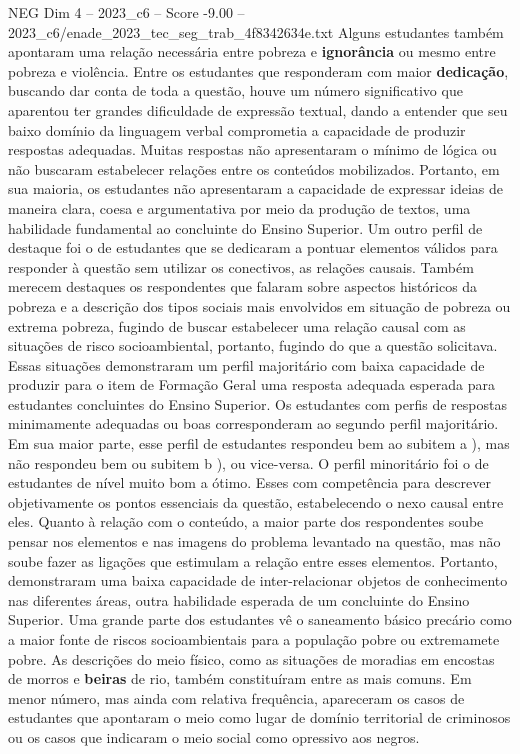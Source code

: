 \begin{textsample}{NEG Dim 4 – 2023\_c6 – Score -9.00 – 2023\_c6/enade\_2023\_tec\_seg\_trab\_4f8342634e.txt}
Alguns estudantes também apontaram uma relação necessária entre pobreza e \textbf{ignorância} ou mesmo entre pobreza e violência.
Entre os estudantes que responderam com maior \textbf{dedicação}, buscando dar conta de toda a questão, houve um número significativo que aparentou ter grandes dificuldade de expressão textual, dando a entender que seu baixo domínio da linguagem verbal comprometia a capacidade de produzir respostas adequadas.
Muitas respostas não apresentaram o mínimo de lógica ou não buscaram estabelecer relações entre os conteúdos mobilizados.
Portanto, em sua maioria, os estudantes não apresentaram a capacidade de expressar ideias de maneira clara, coesa e argumentativa por meio da produção de textos, uma habilidade fundamental ao concluinte do Ensino Superior.
Um outro perfil de destaque foi o de estudantes que se dedicaram a pontuar elementos válidos para responder à questão sem utilizar os conectivos, as relações causais.
Também merecem destaques os respondentes que falaram sobre aspectos históricos da pobreza e a descrição dos tipos sociais mais envolvidos em situação de pobreza ou extrema pobreza, fugindo de buscar estabelecer uma relação causal com as situações de risco socioambiental, portanto, fugindo do que a questão solicitava.
Essas situações demonstraram um perfil majoritário com baixa capacidade de produzir para o item de Formação Geral uma resposta adequada esperada para estudantes concluintes do Ensino Superior.
Os estudantes com perfis de respostas minimamente adequadas ou boas corresponderam ao segundo perfil majoritário.
Em sua maior parte, esse perfil de estudantes respondeu bem ao subitem a ), mas não respondeu bem ou subitem b ), ou vice-versa.
O perfil minoritário foi o de estudantes de nível muito bom a ótimo.
Esses com competência para descrever objetivamente os pontos essenciais da questão, estabelecendo o nexo causal entre eles.
Quanto à relação com o conteúdo, a maior parte dos respondentes soube pensar nos elementos e nas imagens do problema levantado na questão, mas não soube fazer as ligações que estimulam a relação entre esses elementos.
Portanto, demonstraram uma baixa capacidade de inter-relacionar objetos de conhecimento nas diferentes áreas, outra habilidade esperada de um concluinte do Ensino Superior.
Uma grande parte dos estudantes vê o saneamento básico precário como a maior fonte de riscos socioambientais para a população pobre ou extremamete pobre.
As descrições do meio físico, como as situações de moradias em encostas de morros e \textbf{beiras} de rio, também constituíram entre as mais comuns.
Em menor número, mas ainda com relativa frequência, apareceram os casos de estudantes que apontaram o meio como lugar de domínio territorial de criminosos ou os casos que indicaram o meio social como opressivo aos negros.

\end{textsample}

